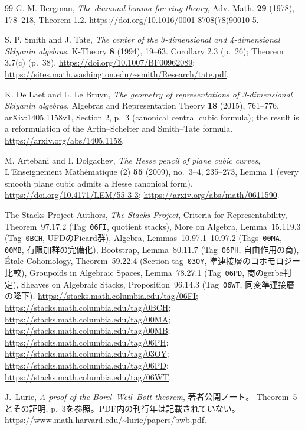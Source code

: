 \begin{thebibliography}{99}
 G. M. Bergman,
\emph{The diamond lemma for ring theory}, Adv. Math. \textbf{29} (1978), 178--218, Theorem 1.2.
\url{https://doi.org/10.1016/0001-8708(78)90010-5}.

S. P. Smith and J. Tate,
\emph{The center of the 3-dimensional and 4-dimensional Sklyanin algebras},
K-Theory \textbf{8} (1994), 19--63.
Corollary 2.3 (p.~26); Theorem 3.7(c) (p.~38).
\url{https://doi.org/10.1007/BF00962089};
\url{https://sites.math.washington.edu/~smith/Research/tate.pdf}.

K. De Laet and L. Le Bruyn,
\emph{The geometry of representations of 3-dimensional Sklyanin algebras},
Algebras and Representation Theory \textbf{18} (2015), 761--776.
arXiv:1405.1158v1, Section 2, p.~3 (canonical central cubic formula);
the result is a reformulation of the Artin--Schelter and Smith--Tate formula.
\url{https://arxiv.org/abs/1405.1158}.

M. Artebani and I. Dolgachev,
\emph{The Hesse pencil of plane cubic curves},
L'Enseignement Math\'ematique (2) \textbf{55} (2009), no.~3--4, 235--273,
Lemma 1 (every smooth plane cubic admits a Hesse canonical form).
\url{https://doi.org/10.4171/LEM/55-3-3};
\url{https://arxiv.org/abs/math/0611590}.

The Stacks Project Authors,
\emph{The Stacks Project},
Criteria for Representability, Theorem~97.17.2
(Tag~\texttt{06FI}, quotient stacks),
More on Algebra, Lemma~15.119.3 (Tag~\texttt{0BCH}, UFDのPicard群),
Algebra, Lemmas~10.97.1--10.97.2 (Tags~\texttt{00MA}, \texttt{00MB}, 有限加群の完備化),
Bootstrap, Lemma~80.11.7 (Tag~\texttt{06PH}, 自由作用の商),
\'Etale Cohomology, Theorem~59.22.4
(Section tag~\texttt{03OY}, 準連接層のコホモロジー比較),
Groupoids in Algebraic Spaces, Lemma~78.27.1
(Tag~\texttt{06PD}, 商のgerbe判定),
Sheaves on Algebraic Stacks, Proposition~96.14.3
(Tag~\texttt{06WT}, 同変準連接層の降下).
\url{https://stacks.math.columbia.edu/tag/06FI};
\url{https://stacks.math.columbia.edu/tag/0BCH};
\url{https://stacks.math.columbia.edu/tag/00MA};
\url{https://stacks.math.columbia.edu/tag/00MB};
\url{https://stacks.math.columbia.edu/tag/06PH};
\url{https://stacks.math.columbia.edu/tag/03OY};
\url{https://stacks.math.columbia.edu/tag/06PD};
\url{https://stacks.math.columbia.edu/tag/06WT}.

J.~Lurie,
\emph{A proof of the Borel--Weil--Bott theorem}, 著者公開ノート。
Theorem~5とその証明, p.~3を参照。PDF内の刊行年は記載されていない。
\url{https://www.math.harvard.edu/~lurie/papers/bwb.pdf}.


\end{thebibliography}
